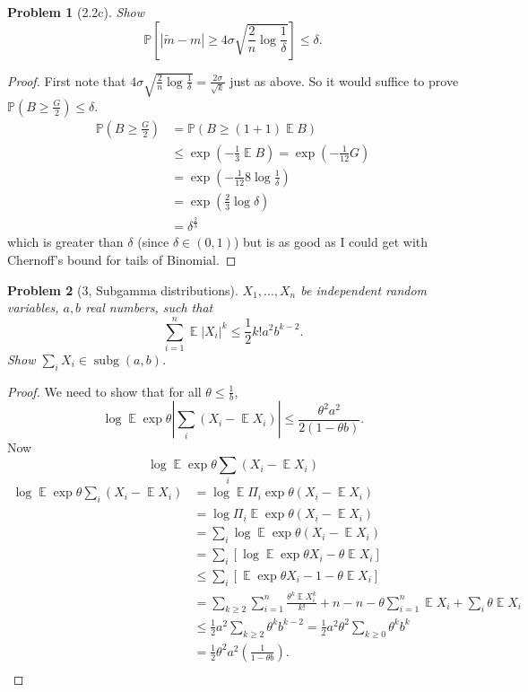 \documentclass{article}
\newtheorem{problem}{Problem}
\newcommand{\expect}{\operatorname{\mathbb{E}}}
\begin{document}
\begin{problem}[2.2c]
Show
\[ \mathbb{P}\left[ |\tilde{m} - m|  \geq 4\sigma\sqrt{\frac{2}{n}\log\frac1\delta}\right] \leq \delta. \]
\end{problem}
\begin{proof}
First note that
 \( 4\sigma\sqrt{\frac{2}{n}\log\frac1\delta}
		 = \frac{2\sigma}{\sqrt{k}} \) just as above.
 So it would suffice to prove \( \mathbb{P}(B\geq\frac{G}{2}) \leq \delta \).
 \[\begin{split}
\mathbb{P}(B \geq \frac{G}{2})
&= \mathbb{P}\left(B \geq (1 + 1) \expect{B}\right) \\
&\leq \exp(-\frac13 \expect{B}) = \exp(-\frac{1}{12}G) \\
&= \exp(-\frac{1}{12} 8\log\frac1\delta) \\
&= \exp(\frac23\log\delta) \\
&= \delta^{\frac23}
\end{split}\]
which is greater than \( \delta \) (since \( \delta\in(0,1) \))
but is as good as I could get with Chernoff's bound for tails of Binomial.
\end{proof}

\begin{problem}[3, Subgamma distributions]
\( X_1, \ldots, X_n \)
be independent random variables,
\( a, b \) real numbers, such that
\[
\sum_{i=1}^n \expect|X_i|^k \leq \frac12 k! a^2 b^{k-2}.
\]
Show \( \sum_i X_i \in \operatorname{subg}(a,b) \).
\end{problem}
\begin{proof}
We need to show that for all \( \theta\leq \frac1b \),
\[ \log\expect\exp \theta|\sum_i(X_i - \expect X_i)| \leq \frac{\theta^2 a^2}{2(1-\theta b)}. \]
Now
\[
\log \expect \exp \theta \sum_i (X_i - \expect X_i)
\]
\[\begin{split}
\log\expect \exp \theta \sum_i(X_i - \expect X_i)
&= \log\expect \Pi_i \exp \theta (X_i - \expect X_i) \\
&= \log\Pi_i \expect \exp \theta (X_i - \expect X_i) \\
&= \sum_i \log\expect \exp \theta (X_i - \expect X_i)\\
&= \sum_i \left[\log\expect\exp\theta X_i - \theta \expect X_i\right]\\
&\leq \sum_i \left[\expect \exp \theta X_i - 1 - \theta\expect X_i\right]\\
&= \sum_{k\geq 2} \sum_{i=1}^n \frac{\theta^k \expect X_i^k}{k!} + n - n - \theta \sum_{i=1}^n \expect X_i + \sum_i \theta \expect X_i\\
&\leq \frac12 a^2  \sum_{k\geq2}\theta^{k} b^{k-2}
= \frac12 a^2 \theta^2 \sum_{k\geq 0} \theta^k b^k\\
&= \frac12\theta^2a^2 (\frac{1}{1-\theta b}). \\
\end{split}\]
\end{proof}
\end{document}
